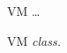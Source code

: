 \begin{figure}[H]
\centering
\begin{class}{VM}
\dots
\end{class}
\caption{VM \textit{class.}}
\label{oz_vm_class}
\end{figure}